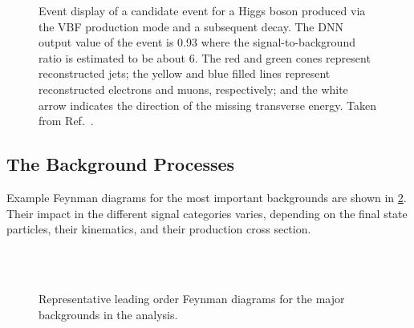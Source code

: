 \begin{figure}
    {}
    {}
    \caption{Event display of a candidate event for a Higgs boson produced via the VBF production mode and a subsequent \HWWdet decay. The DNN output value of the event is 0.93 where the signal-to-background ratio is estimated to be about 6. 
    The red and green cones represent reconstructed jets; the yellow and blue filled lines represent reconstructed electrons and muons, respectively; and the white arrow indicates the direction of the missing transverse energy. 
    Taken from Ref.~\cite{HWWPaper}.}
    \label{fig:vbf-event-display}
\end{figure}

\subsection{The Background Processes}
Example Feynman diagrams for the most important backgrounds are shown in \cref{fig:hww:feyn-bkgs}.
Their impact in the different signal categories varies, depending on the final state particles, their kinematics, and their production cross section. 
\begin{figure}[ht]
     \hspace{5em}
     \\
     \hspace{5em}
     \\
     \hspace{5em}
    \caption{Representative leading order Feynman diagrams for the major backgrounds in the \HWW analysis.} 
    \label{fig:hww:feyn-bkgs}
\end{figure}

